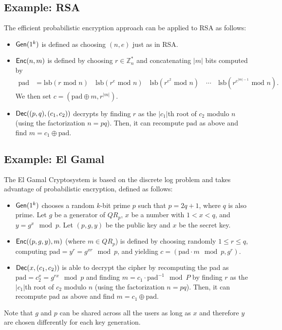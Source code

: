 \documentclass[10pt]{article}
\begin{document}
\subsection{Example: RSA}

The efficient probabilistic encryption approach can be applied to RSA as follows:
\begin{itemize}
	\item $\mathsf{Gen}(1^k)$ is defined as choosing $(n,e)$ just as in RSA.
	\item $\mathsf{Enc}(n,m)$ is defined by choosing $r \in \mathbb{Z}_n^{*}$ and concatenating $|m|$ bits computed by
	\begin{align*}
	\text{pad} &= \text{lsb}(r \text{ mod } n) \quad \text{lsb}(r^e \text{ mod } n) \quad  \text{lsb}(r^{e^2} \text{ mod } n) \quad  \cdots \quad  \text{lsb}(r^{e^{|m|-1}} \text{ mod } n).
	\end{align*}
	We then set $c=( \text{pad} \oplus m, r^{|m|})$.
	\item $\mathsf{Dec}((p,q),(c_1, c_2))$ decrypts by finding $r$ as the $|c_1|$th root of $c_2$ modulo $n$ (using the factorization $n=pq$). Then, it can recompute $\text{pad}$ as above and find $m = c_1 \oplus \text{pad}$.
\end{itemize}

\subsection{Example: El Gamal}

The El Gamal Cryptosystem \cite{ElGamal} is based on the discrete log problem and takes advantage of probabilistic encryption, defined as follows:
\begin{itemize}
	\item $\mathsf{Gen}(1^k)$ chooses a random $k$-bit prime $p$ such that $p=2q+1$, where $q$ is also prime. Let $g$ be a generator of $QR_p$, $x$ be a number with $1 < x < q$, and $y = g^x \mod p$. Let $(p,g,y)$ be the public key and $x$ be the secret key.
	\item $\mathsf{Enc}((p,g,y),m)$ (where $m \in QR_p$) is defined by choosing randomly $1 \le r \le q$, computing $\text{pad} = y^r = g^{xr} \mod p$, and yielding $c = (\text{pad} \cdot m \mod p, g^{r})$.
	\item $\mathsf{Dec}(x,(c_1, c_2))$ is able to decrypt the cipher by recomputing the pad as $\text{pad} = c_2^x = g^{rx} \mod p$ and finding $m = c_1 \cdot \text{pad}^{-1} \mod P$ by finding $r$ as the $|c_1|$th root of $c_2$ modulo $n$ (using the factorization $n=pq$). Then, it can recompute $\text{pad}$ as above and find $m = c_1 \oplus \text{pad}$.
\end{itemize}
Note that $g$ and $p$ can be shared across all the users as long as $x$ and therefore $y$ are chosen differently for each key generation. 
\end{document}
